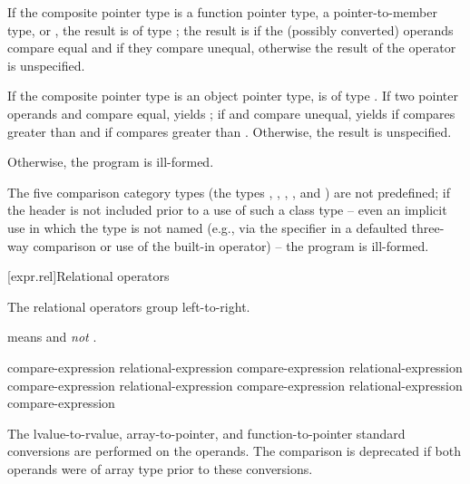 \pnum
If the composite pointer type is
a function pointer type,
a pointer-to-member type, or
,
the result is of type ;
the result is
if the (possibly converted) operands compare equal
and
if they compare unequal,
otherwise the result of the operator is unspecified.

\pnum
If the composite pointer type is an object pointer type,
 is of type .
If two pointer operands  and  compare equal,
 yields ;
if  and  compare unequal,
 yields
if  compares greater than 
and
if  compares greater than .
Otherwise, the result is unspecified.

\pnum
Otherwise, the program is ill-formed.

\pnum
The five comparison category types
(the types
,
,
,
, and
)
are not predefined;
if the header 
is not included prior to a use of such a class type --
even an implicit use in which the type is not named
(e.g., via the  specifier
in a defaulted three-way comparison
or use of the built-in operator) -- the program is ill-formed.

[expr.rel]{Relational operators}%
%

\pnum
The relational operators group left-to-right.
\begin{example}
 means  and \emph{not}
.
\end{example}
%
%
%
%
%
%
%
%
%
\begin{bnf}
\br
    compare-expression\br
    relational-expression \terminal{<} compare-expression\br
    relational-expression \terminal{>} compare-expression\br
    relational-expression \terminal{<=} compare-expression\br
    relational-expression \terminal{>=} compare-expression
\end{bnf}
%
The
lvalue-to-rvalue,
array-to-pointer,
and function-to-pointer
standard conversions are performed on the operands.
The comparison is deprecated if
both operands were of array type
prior to these conversions.

